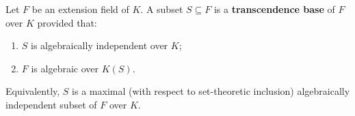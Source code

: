 Let $F$ be an extension field of $K$. A subset $S \subseteq F$ is a \textbf{transcendence base} of $F$ over $K$ provided that:
\begin{enumerate}
\item[(i)] $S$ is algebraically independent over $K$;
\item[(ii)] $F$ is algebraic over $K(S)$.
\end{enumerate}
Equivalently, $S$ is a maximal (with respect to set-theoretic inclusion) algebraically independent subset of $F$ over $K$.
